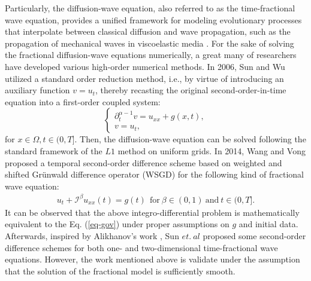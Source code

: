 \documentclass[11pt]{article}
\numberwithin{equation}{section}
\begin{document}
Particularly, the diffusion-wave equation, also referred to as the time-fractional wave equation, provides a unified framework for modeling evolutionary processes that interpolate between classical diffusion and wave propagation, such as the propagation of mechanical waves in viscoelastic media \cite{Mainardi,Mainardi1}. For the sake of solving the fractional diffusion-wave equations numerically, a great many of researchers have developed various high-order numerical methods. In 2006, Sun and Wu \cite{Sun1} utilized a standard order reduction method, i.e., by virtue of introducing an auxiliary function $v=u_t$, thereby recasting the original second-order-in-time equation into a first-order coupled system:
\begin{equation}\label{eq-or}
\begin{cases}
\partial_t
^{\alpha-1}v=u_{xx} + g(x, t),\\
v = u_t,
\end{cases}
\end{equation}
for $x\in\Omega, t\in(0, T]$. 
Then, the diffusion-wave equation can be solved following the standard framework of the $L1$ method on uniform grids. In 2014, Wang and Vong \cite{WangJCP} proposed a temporal second-order difference scheme based on weighted and shifted Gr\"{u}nwald difference operator (WSGD) for the following kind of fractional wave equation:  
\begin{align}\label{eq-inte}
u_t + \mathcal{I}^\beta u_{xx}(t) = g(t)~~\mbox{for}~ \beta \in(0, 1) ~\mbox{and}~t\in(0,T].    
\end{align} 
It can be observed that the above integro-differential problem is mathematically equivalent to the Eq. (\ref{eq-gov}) under proper assumptions on $g$ and initial data.
Afterwards, inspired by Alikhanov's work \cite{Alikhanov}, Sun $et.~al$ \cite{Sun} proposed some second-order difference schemes for both one- and two-dimensional time-fractional wave equations. However, the work mentioned above is validate under the assumption that the solution of the fractional model is sufficiently smooth.
\end{document}
